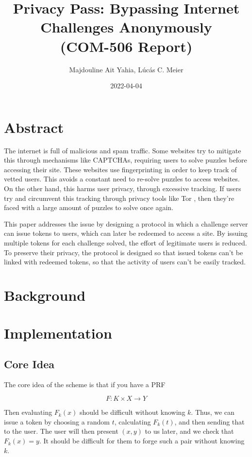 \documentclass[9pt, a4paper]{article}
\date{2022-04-04}
\title{Privacy Pass: Bypassing Internet Challenges Anonymously\\
\large (COM-506 Report)
}
\author{Majdouline Ait Yahia, Lúcás C. Meier}
\begin{document}
\maketitle

\section*{Abstract}
The internet is full of malicious and spam traffic. Some websites
try to mitigate this through mechanisms like CAPTCHAs, requiring
users to solve puzzles before accessing their site. These websites
use fingerprinting in order to keep track of vetted users. This avoids
a constant need to re-solve puzzles to access websites. On the other hand,
this harms user privacy, through excessive tracking. If users try
and circumvent this tracking through privacy tools like
Tor \cite{tor_2004}, then they're faced with a large amount of puzzles
to solve once again.

This paper \cite{davidson_privacy_2018} addresses the issue by designing
a protocol in which a challenge server can issue tokens to users,
which can later be redeemed to access a site. By issuing multiple
tokens for each challenge solved, the effort of legitimate users
is reduced. To preserve their privacy, the protocol is designed
so that issued tokens can't be linked with redeemed tokens, so
that the activity of users can't be easily tracked.

\section{Background}
\section{Implementation}

\subsection{Core Idea}

The core idea of the scheme is that if you have a PRF

$$
F : K \times X \to Y
$$

Then evaluating $F_k(x)$ should be difficult without knowing $k$. Thus,
we can issue a token by choosing a random $t$, calculating $F_k(t)$,
and then sending that to the user. The user will then present
$(x, y)$ to us later, and we check that $F_k(x) = y$. It should be difficult
for them to forge such a pair without knowing $k$.
\end{document}
